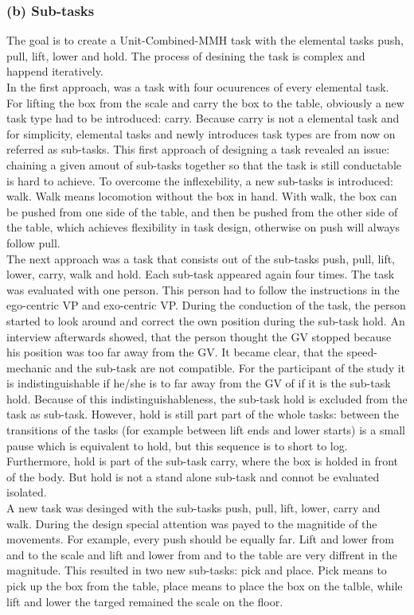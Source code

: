 \subsubsection{(b) Sub-tasks}
The goal is to create a Unit-Combined-MMH task with the elemental tasks push, pull, lift, lower and hold. The process of desining the task is complex and happend iteratively.\\
In the first approach, was a task with four ocuurences of every elemental task. For lifting the box from the scale and carry the box to the table, obviously a new task type had to be introduced: carry. Because carry is not a elemental task and for simplicity, elemental tasks and newly introduces task types are from now on referred as sub-tasks. This first approach of designing a task revealed an issue: chaining a given amout of sub-tasks together so that the task is still conductable is hard to achieve. To overcome the inflexebility, a new sub-tasks is introduced: walk. Walk means locomotion without the box in hand. With walk, the box can be pushed from one side of the table, and then be pushed from the other side of the table, which achieves flexibility in task design, otherwise on push will always follow pull.\\
The next approach was a task that consists out of the sub-tasks push, pull, lift, lower, carry, walk and hold. Each sub-task appeared again four times. The task was evaluated with one person. This person had to follow the instructions in the ego-centric VP and exo-centric VP. During the conduction of the task, the person started to look around and correct the own position during the sub-task hold. An interview afterwards showed, that the person thought the GV stopped because his position was too far away from the GV. It became clear, that the speed-mechanic and the sub-task are not compatible. For the participant of the study it is indistinguishable if he/she is to far away from the GV of if it is the sub-task hold. Because of this indistinguishableness, the sub-task hold is excluded from the task as sub-task. However, hold is still part part of the whole tasks: between the transitions of the tasks (for example between lift ends and lower starts) is a small pause which is equivalent to hold, but this sequence is to short to log. Furthermore, hold is part of the sub-task carry, where the box is holded in front of the body. But hold is not a stand alone sub-task and connot be evaluated isolated.\\
A new task was desinged with the sub-tasks push, pull, lift, lower, carry and walk. During the design special attention was payed to the magnitide of the movements. For example, every push should be equally far. Lift and lower from and to the scale and lift and lower from and to the table are very diffrent in the magnitude. This resulted in two new sub-tasks: pick and place. Pick means to pick up the box from the table, place means to place the box on the talble, while lift and lower the targed remained the scale on the floor.\\
